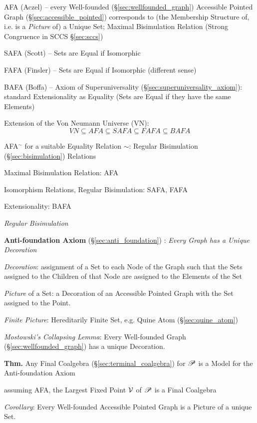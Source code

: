 \cite{aczel88}

AFA (Aczel) -- every Well-founded (\S\ref{sec:wellfounded_graph})
Accessible Pointed Graph (\S\ref{sec:accessible_pointed}) corresponds
to (the Membership Structure of, i.e. is a \emph{Picture} of) a Unique
Set; Maximal Bisimulation Relation (Strong Congruence in SCCS
\S\ref{sec:sccs})

SAFA (Scott) -- Sets are Equal if Isomorphic

FAFA (Finsler) -- Sets are Equal if Isomorphic (different sense)

BAFA (Boffa) -- Axiom of Superuniversality
(\S\ref{sec:superuniversality_axiom}): standard Extensionality as
Equality (Sets are Equal if they have the same Elements)

Extension of the Von Neumann Universe (VN):
\[
  VN \subseteq AFA \subseteq SAFA \subseteq FAFA \subseteq BAFA
\]

AFA$^\sim$ for a suitable Equality Relation $\sim$: Regular
Bisimulation (\S\ref{sec:bisimulation}) Relations

Maximal Bisimulation Relation: AFA

Isomorphism Relations, Regular Bisimulation: SAFA, FAFA

Extensionality: BAFA

\emph{Regular Bisimulation} %



\textbf{Anti-foundation Axiom} (\S\ref{sec:anti_foundation})
\cite{aczel88}: \emph{Every Graph has a Unique Decoration}

\emph{Decoration}: assignment of a Set to each Node of the Graph such
that the Sets assigned to the Children of that Node are assigned to
the Elements of the Set

\emph{Picture} of a Set: a Decoration of an Accessible Pointed Graph
with the Set assigned to the Point.

\emph{Finite Picture}: Hereditarily Finite Set, e.g. Quine Atom
(\S\ref{sec:quine_atom})

\emph{Mostowski's Collapsing Lemma}: Every Well-founded Graph
(\S\ref{sec:wellfounded_graph}) has a unique Decoration.

\textbf{Thm.} Any Final Coalgebra (\S\ref{sec:terminal_coalgebra}) for
$\mathscr{P}$ is a Model for the Anti-foundation Axiom

assuming AFA, the Largest Fixed Point $\mathcal{V}$ of $\mathscr{P}$ is a Final
Coalgebra

\emph{Corollary}: Every Well-founded Accessible Pointed Graph is a
Picture of a unique Set.


